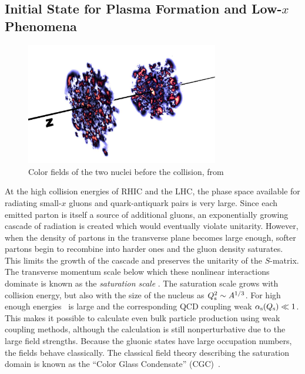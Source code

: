 \subsection{Initial State for Plasma Formation and Low-$x$ Phenomena}


\begin{figure}[h!]
\centerline{
\includegraphics[width=0.75\textwidth]{fig/wVdagVLHC}}
\caption[Color fields of the two nuclei before the collision]{Color fields of the two nuclei before the collision,
from~\cite{Schenke:2012fw}}
\label{fig:colorfield}
\end{figure}

\label{Sec:Saturation}


At the high collision energies of RHIC and the LHC, the  phase space available for radiating small-$x$ 
gluons and quark-antiquark pairs is very large. Since each emitted parton is itself a source of 
additional gluons, an exponentially growing cascade of radiation is created which would 
eventually violate unitarity. However, when the density of partons in the transverse plane
becomes large enough, softer partons begin to recombine into harder ones and the gluon 
density saturates. This limits the growth of the cascade  and preserves the 
unitarity of the $S$-matrix. 
The transverse momentum scale below which these nonlinear interactions dominate is known as 
the \emph{saturation scale} \qs . The saturation scale grows with collision energy, but also with the
size of the nucleus as $Q_{\mathrm{s}}^2 \sim A^{1/3}$. For high enough energies \qs\ is large and
the corresponding QCD coupling weak $\alpha_{\mathrm{s}}(Q_{\mathrm{s}}) \ll 1$. This makes it possible to calculate 
even bulk particle production using weak coupling methods, although the calculation is still  nonperturbative due to the large field strengths. Because the gluonic states have large 
occupation numbers, the fields behave 
classically. The classical field theory describing the saturation domain is
known as the ``Color Glass Condensate'' (CGC)~\cite{Gelis:2010nm}. 

